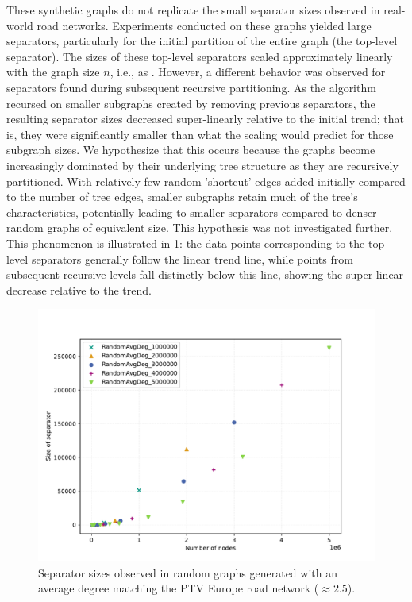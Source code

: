 These synthetic graphs do not replicate the small separator sizes observed in real-world road networks.
Experiments conducted on these graphs yielded large separators, particularly for the initial partition of the entire graph (the top-level separator).
The sizes of these top-level separators scaled approximately linearly with the graph size \(n\), i.e., as .
However, a different behavior was observed for separators found during subsequent recursive partitioning.
As the algorithm recursed on smaller subgraphs created by removing previous separators, the resulting separator sizes decreased super-linearly relative to the initial trend; that is, they were significantly smaller than what the  scaling would predict for those subgraph sizes.
We hypothesize that this occurs because the graphs become increasingly dominated by their underlying tree structure as they are recursively partitioned.
With relatively few random 'shortcut' edges added initially compared to the number of tree edges, smaller subgraphs retain much of the tree's characteristics, potentially leading to smaller separators compared to denser random graphs of equivalent size.
This hypothesis was not investigated further.
This phenomenon is illustrated in \cref{fig:same_degree}: the data points corresponding to the top-level separators generally follow the linear trend line, while points from subsequent recursive levels fall distinctly below this line, showing the super-linear decrease relative to the trend.



\begin{figure}[tbhp]
    \centering
    \includegraphics[width=0.6\linewidth]{graphics/RandomAvgDeg2.5.pdf}
    \caption{Separator sizes observed in random graphs generated with an average degree matching the PTV Europe road network (\( \approx 2.5 \)).}
    \label{fig:same_degree}
\end{figure}


